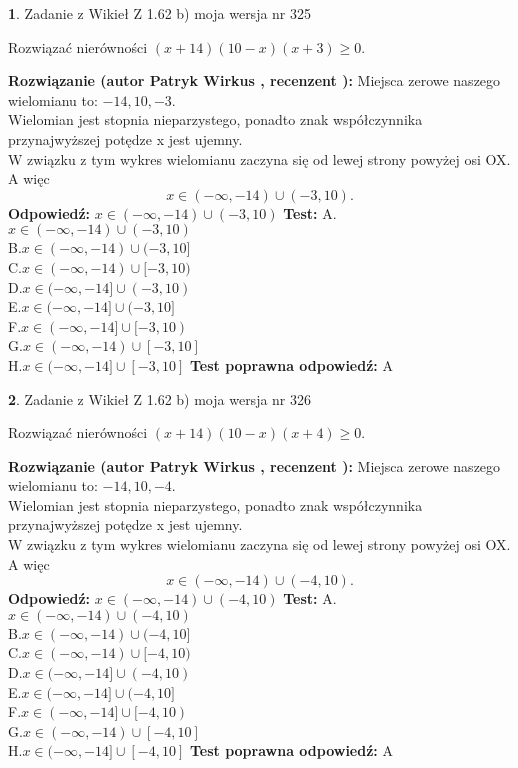 \documentclass[12pt, a4paper]{article}
\theoremstyle{definition} %
\newtheorem{zad}{}
\newcommand{\zadStart}[1]{\begin{zad}#1\newline}
\newcommand{\zadStop}{\end{zad}}
\newcommand{\rozwStart}[2]{\noindent \textbf{Rozwiązanie (autor #1 , recenzent #2): }\newline}
\newcommand{\rozwStop}{\newline}
\newcommand{\odpStart}{\noindent \textbf{Odpowiedź:}\newline}
\newcommand{\odpStop}{\newline}
\newcommand{\testStart}{\noindent \textbf{Test:}\newline}
\newcommand{\testStop}{\newline}
\newcommand{\kluczStart}{\noindent \textbf{Test poprawna odpowiedź:}\newline}
\newcommand{\kluczStop}{\newline}
\begin{document}
\zadStart{Zadanie z Wikieł Z 1.62 b) moja wersja nr 325}

Rozwiązać nierówności $(x+14)(10-x)(x+3)\ge0$.
\zadStop
\rozwStart{Patryk Wirkus}{}
Miejsca zerowe naszego wielomianu to: $-14, 10, -3$.\\
Wielomian jest stopnia nieparzystego, ponadto znak współczynnika przy\linebreak najwyższej potędze x jest ujemny.\\ W związku z tym wykres wielomianu zaczyna się od lewej strony powyżej osi OX. A więc $$x \in (-\infty,-14) \cup (-3,10).$$
\rozwStop
\odpStart
$x \in (-\infty,-14) \cup (-3,10)$
\odpStop
\testStart
A.$x \in (-\infty,-14) \cup (-3,10)$\\
B.$x \in (-\infty,-14) \cup (-3,10]$\\
C.$x \in (-\infty,-14) \cup [-3,10)$\\
D.$x \in (-\infty,-14] \cup (-3,10)$\\
E.$x \in (-\infty,-14] \cup (-3,10]$\\
F.$x \in (-\infty,-14] \cup [-3,10)$\\
G.$x \in (-\infty,-14) \cup [-3,10]$\\
H.$x \in (-\infty,-14] \cup [-3,10]$
\testStop
\kluczStart
A
\kluczStop



\zadStart{Zadanie z Wikieł Z 1.62 b) moja wersja nr 326}

Rozwiązać nierówności $(x+14)(10-x)(x+4)\ge0$.
\zadStop
\rozwStart{Patryk Wirkus}{}
Miejsca zerowe naszego wielomianu to: $-14, 10, -4$.\\
Wielomian jest stopnia nieparzystego, ponadto znak współczynnika przy\linebreak najwyższej potędze x jest ujemny.\\ W związku z tym wykres wielomianu zaczyna się od lewej strony powyżej osi OX. A więc $$x \in (-\infty,-14) \cup (-4,10).$$
\rozwStop
\odpStart
$x \in (-\infty,-14) \cup (-4,10)$
\odpStop
\testStart
A.$x \in (-\infty,-14) \cup (-4,10)$\\
B.$x \in (-\infty,-14) \cup (-4,10]$\\
C.$x \in (-\infty,-14) \cup [-4,10)$\\
D.$x \in (-\infty,-14] \cup (-4,10)$\\
E.$x \in (-\infty,-14] \cup (-4,10]$\\
F.$x \in (-\infty,-14] \cup [-4,10)$\\
G.$x \in (-\infty,-14) \cup [-4,10]$\\
H.$x \in (-\infty,-14] \cup [-4,10]$
\testStop
\kluczStart
A
\kluczStop
\end{document}
